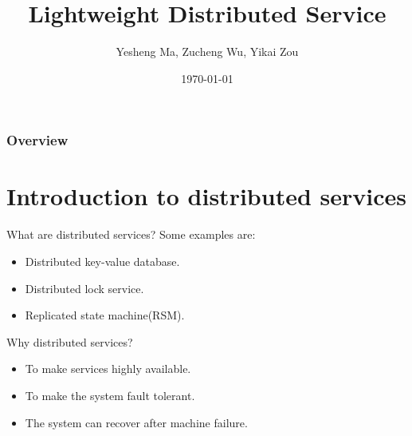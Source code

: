 \documentclass{beamer}
\title[Short title]{Lightweight Distributed Service} %
\author{Yesheng Ma, Zucheng Wu, Yikai Zou} %
\institute[SJTU] %
{
Shanghai Jiao Tong University
}
\date{\today} %
\begin{document}
\begin{frame}
\titlepage %
\end{frame}

\begin{frame}
\frametitle{Overview}
\tableofcontents %
\end{frame}


\section{Introduction to distributed services} 

\begin{frame}{What are distributed services?}
Some examples are:

\begin{itemize}
\item Distributed key-value database.
\item Distributed lock service.
\item Replicated state machine(RSM).
\end{itemize}
\end{frame}

\begin{frame}{Why distributed services?}

\begin{itemize}
\item To make services highly available.
\item To make the system fault tolerant.
\item The system can recover after machine failure.
\end{itemize}

\end{frame}
\end{document}
